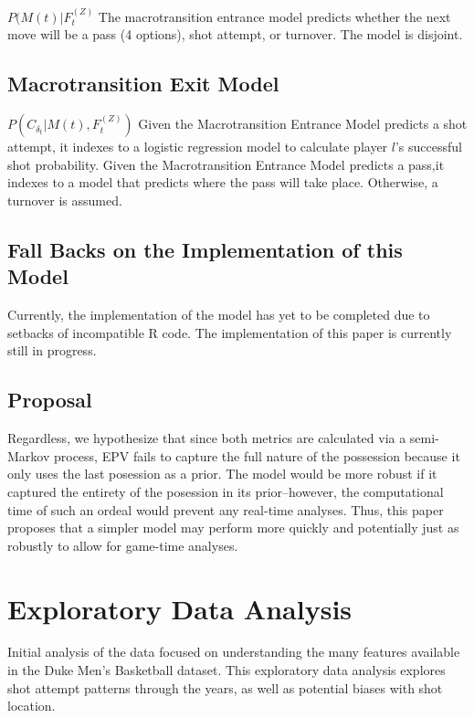 \documentclass[12pt,twoside]{dukestatscithesis}
\theoremstyle{definition}
\theoremstyle{definition}
\theoremstyle{definition}
\theoremstyle{remark}
\begin{document}
\(P(M(t)|F_{t}^{(Z)}\) The macrotransition entrance model predicts
whether the next move will be a pass (4 options), shot attempt, or
turnover. The model is disjoint.

\section{Macrotransition Exit Model}\label{macrotransition-exit-model}

\(P(C_{\delta_{t}}|M(t), F_{t}^{(Z)})\) Given the Macrotransition
Entrance Model predicts a shot attempt, it indexes to a logistic
regression model to calculate player \(l\)'s successful shot
probability. Given the Macrotransition Entrance Model predicts a pass,it
indexes to a model that predicts where the pass will take place.
Otherwise, a turnover is assumed.

\section{Fall Backs on the Implementation of this
Model}\label{fall-backs-on-the-implementation-of-this-model}

Currently, the implementation of the model has yet to be completed due
to setbacks of incompatible R code. The implementation of this paper is
currently still in progress.

\section{Proposal}\label{proposal}

Regardless, we hypothesize that since both metrics are calculated via a
semi-Markov process, EPV fails to capture the full nature of the
possession because it only uses the last posession as a prior. The model
would be more robust if it captured the entirety of the posession in its
prior--however, the computational time of such an ordeal would prevent
any real-time analyses. Thus, this paper proposes that a simpler model
may perform more quickly and potentially just as robustly to allow for
game-time analyses.

\chapter{Exploratory Data Analysis}\label{exploratory-data-analysis}

Initial analysis of the data focused on understanding the many features
available in the Duke Men's Basketball dataset. This exploratory data
analysis explores shot attempt patterns through the years, as well as
potential biases with shot location.
\end{document}

